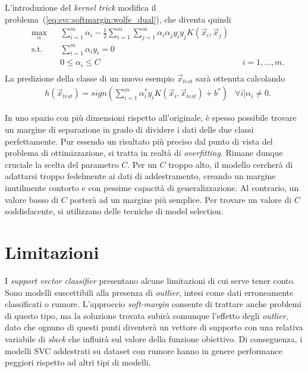 L'introduzione del \emph{kernel trick} modifica il problema~(\ref{eq:svc:softmargin:wolfe_dual}), che diventa quindi
\begin{equation}\label{eq:svc:softmargin:wolfe_dual_plus_kernel_trick}
\begin{aligned}
& \max_{\alpha}    && \sum_{i=1}^{m}\alpha_i - \frac{1}{2}\sum_{i=1}^{m}\sum_{j=1}^{m}\alpha_i\alpha_jy_iy_jK(\Vec{x}_i, \Vec{x}_j)\\
& \textrm{s.t.} && \sum_{i=1}^{m} \alpha_iy_i = 0 \\
&               && 0 \leq \alpha_i \leq C && i=1,\dots,m. \\
\end{aligned}
\end{equation}
%
La predizione della classe di un nuovo esempio $\Vec{x}_{test}$ sarà ottenuta calcolando 
\begin{equation*}
\begin{aligned}
& h(\Vec{x}_{test}) = sign\left(\sum_{i=1}^{m}\alpha_i^*y_iK(\Vec{x}_i, \Vec{x}_{test}) + b^*\right) & \forall i | \alpha_i \neq 0.
\end{aligned}
\end{equation*}

In uno spazio con più dimensioni rispetto all'originale, è spesso possibile trovare un margine di separazione in grado di dividere i dati delle due classi perfettamente. Pur essendo un risultato più preciso dal punto di vista del problema di ottimizzazione, si tratta in realtà di \emph{overfitting}. Rimane dunque cruciale la scelta del parametro $C$. Per un $C$ troppo alto, il modello cercherà di adattarsi troppo fedelmente ai dati di addestramento, creando un margine inutilmente contorto e con pessime capacità di generalizzazione. Al contrario, un valore basso di $C$ porterà ad un margine più semplice. Per trovare un valore di $C$ soddisfacente, si utilizzano delle tecniche di model selection.  



\section{Limitazioni}\label{sec:svc_limiti}
I \emph{support vector classifier} presentano alcune limitazioni di cui serve tener conto. 
Sono modelli suscettibili alla presenza di \emph{outlier}, intesi come dati erroneamente classificati o rumore. L'approccio \emph{soft-margin} consente di trattare anche problemi di questo tipo, ma la soluzione trovata subirà comunque l'effetto degli \emph{outlier}, dato che ognuno di questi punti diventerà un vettore di supporto con una relativa variabile di \emph{slack} che influirà sul valore della funzione obiettivo. Di conseguenza, i modelli SVC addestrati su dataset con rumore hanno in genere performance peggiori rispetto ad altri tipi di modelli. 

